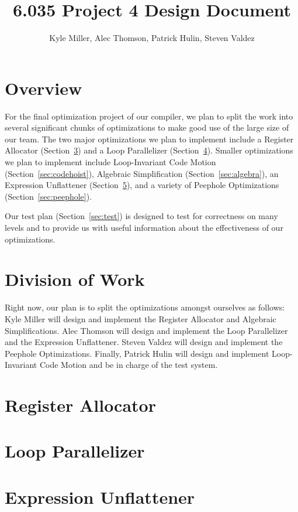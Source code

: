 \documentclass[11pt]{article}
\title{6.035 Project 4 Design Document}
\author{Kyle Miller, Alec Thomson, Patrick Hulin, Steven Valdez}
\begin{document}
\maketitle

\section {Overview} 

For the final optimization project of our compiler, we plan to split
the work into several significant chunks of optimizations to make good
use of the large size of our team. The two major optimizations we plan
to implement include a Register Allocator (Section~\ref{sec:register}) and a Loop
Parallelizer (Section~\ref{sec:parallel}). Smaller optimizations we plan to implement include
Loop-Invariant Code Motion (Section~\ref{sec:codehoist}), Algebraic
Simplification (Section~\ref{sec:algebra}), an Expression
Unflattener (Section~\ref{sec:unflatten}), and a variety of Peephole
Optimizations (Section~\ref{sec:peephole}). 

Our test plan (Section~\ref{sec:test}) is designed to test for correctness on many levels and
to provide us with useful information about the effectiveness of our
optimizations. 

\section {Division of Work}

Right now, our plan is to split the optimizations amongst ourselves as
follows: Kyle Miller will design and implement the Register
Allocator and Algebraic Simplifications. Alec Thomson will design and implement the Loop
Parallelizer and the Expression Unflattener. Steven Valdez will design and implement the Peephole
Optimizations. Finally, Patrick Hulin will design and implement
Loop-Invariant Code Motion and be in charge of the test system. 

\section {Register Allocator}
\label{sec:register}

\section {Loop Parallelizer}
\label{sec:parallel}

\section {Expression Unflattener}
\label{sec:unflatten}
\end{document}
